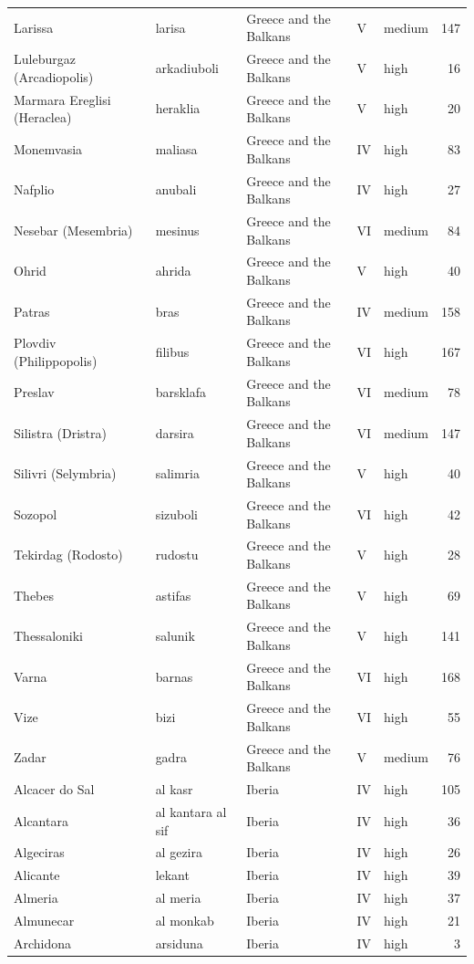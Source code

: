 \documentclass[11pt,a4paper]{article}
\begin{document}
{\begin{longtable}{p{4.6cm}p{3.0cm}p{3.6cm}llr}
Larissa & larisa & Greece and the Balkans & V & medium & 147\\
Luleburgaz (Arcadiopolis) & arkadiuboli & Greece and the Balkans & V & high & 16\\
Marmara Ereglisi (Heraclea) & heraklia & Greece and the Balkans & V & high & 20\\
Monemvasia & maliasa & Greece and the Balkans & IV & high & 83\\
Nafplio & anubali & Greece and the Balkans & IV & high & 27\\
Nesebar (Mesembria) & mesinus & Greece and the Balkans & VI & medium & 84\\
Ohrid & ahrida & Greece and the Balkans & V & high & 40\\
Patras & bras & Greece and the Balkans & IV & medium & 158\\
Plovdiv (Philippopolis) & filibus & Greece and the Balkans & VI & high & 167\\
Preslav & barsklafa & Greece and the Balkans & VI & medium & 78\\
Silistra (Dristra) & darsira & Greece and the Balkans & VI & medium & 147\\
Silivri (Selymbria) & salimria & Greece and the Balkans & V & high & 40\\
Sozopol & sizuboli & Greece and the Balkans & VI & high & 42\\
Tekirdag (Rodosto) & rudostu & Greece and the Balkans & V & high & 28\\
Thebes & astifas & Greece and the Balkans & V & high & 69\\
Thessaloniki & salunik & Greece and the Balkans & V & high & 141\\
Varna & barnas & Greece and the Balkans & VI & high & 168\\
Vize & bizi & Greece and the Balkans & VI & high & 55\\
Zadar & gadra & Greece and the Balkans & V & medium & 76\\
Alcacer do Sal & al kasr & Iberia & IV & high & 105\\
Alcantara & al kantara al sif & Iberia & IV & high & 36\\
Algeciras & al gezira & Iberia & IV & high & 26\\
Alicante & lekant & Iberia & IV & high & 39\\
Almeria & al meria & Iberia & IV & high & 37\\
Almunecar & al monkab & Iberia & IV & high & 21\\
Archidona & arsiduna & Iberia & IV & high & 3\\

\end{longtable}}
\end{document}
